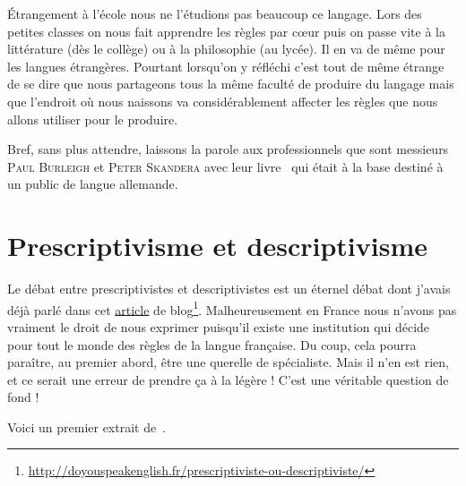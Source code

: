  \'Etrangement à l'école nous ne l'étudions pas beaucoup ce
 langage. Lors des petites classes on nous fait apprendre les règles
 par c{\oe}ur puis on passe vite à la littérature (dès le collège) ou
 à la philosophie (au lycée). Il en va de même pour les langues
 étrangères. Pourtant lorsqu'on y réfléchi c'est tout de même étrange
 de se dire que nous partageons tous la même faculté de produire du
 langage mais que l'endroit où nous naissons va considérablement
 affecter les règles que nous allons utiliser pour le produire.

 Bref, sans plus attendre, laissons la parole aux professionnels que sont
 messieurs \textsc{Paul Burleigh} et \textsc{Peter Skandera} avec leur
 livre~\cite{burleigh} qui était à la base destiné à un public de langue allemande.

\newpage
\minitoc
\newpage

\section{Prescriptivisme et descriptivisme}

Le débat entre prescriptivistes et descriptivistes est un éternel
débat dont j'avais déjà parlé dans cet
\href{http://doyouspeakenglish.fr/prescriptiviste-ou-descriptiviste/}{article}
de
blog\footnote{\url{http://doyouspeakenglish.fr/prescriptiviste-ou-descriptiviste/}}. Malheureusement
en France nous n'avons pas vraiment le droit de nous exprimer
puisqu'il existe une institution qui décide pour tout le monde des
règles de la langue française. Du coup, cela pourra paraître, au
premier abord, être une querelle de spécialiste. Mais il n'en est
rien, et ce serait une erreur de prendre ça à la légère ! C'est une
véritable question de fond !

Voici un premier extrait de~\cite{burleigh}.

\begin{center}
\begin{mdframed}[style=citestyle, frametitle={Extrait de~\cite{burleigh}}]
\end{mdframed}  
\end{center}

